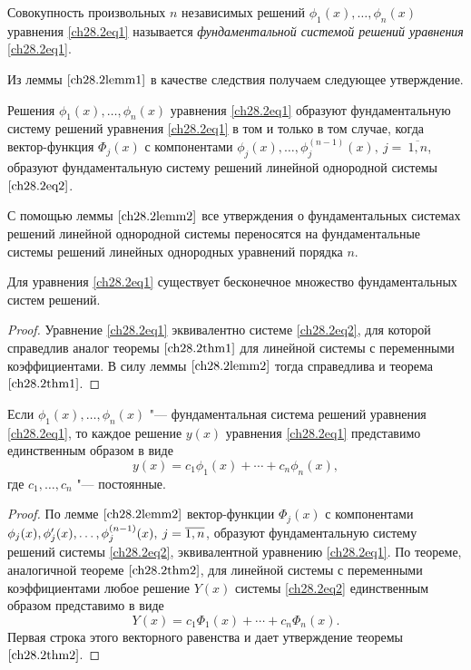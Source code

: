 \begin{defn}
Совокупность произвольных $n$ независимых решений $\phi_1(x), \ldots, \phi_n(x)$ уравнения \eqref{ch28.2eq1} называется \textit{фундаментальной системой решений уравнения} \eqref{ch28.2eq1}.
\end{defn}

Из леммы $\ref{ch28.2lemm1}$ в качестве следствия получаем следующее утверждение.

\begin{lemm} \label{ch28.2lemm2}
Решения $\phi_1(x), \ldots, \phi_n(x)$ уравнения \eqref{ch28.2eq1} образуют фундаментальную систему решений уравнения \eqref{ch28.2eq1} в том и только в том случае, когда вектор-функция $\Phi_j(x)$ с компонентами $\phi_j(x), \ldots, \phi^{(n - 1)}_j(x),\ j =\ \overline{1,n}$, образуют фундаментальную систему решений линейной однородной системы $\eqref{ch28.2eq2}$.
\end{lemm}

С помощью леммы $\ref{ch28.2lemm2}$ все утверждения о фундаментальных системах решений линейной однородной системы переносятся на фундаментальные системы решений линейных однородных уравнений порядка $n$.

\begin{thm} \label{ch28.2thm1}
Для уравнения \eqref{ch28.2eq1} существует бесконечное множество фундаментальных систем решений.
\end{thm}

\begin{proof}
Уравнение \eqref{ch28.2eq1} эквивалентно системе \eqref{ch28.2eq2}, для которой справедлив аналог теоремы $\ref{ch28.2thm1}$ для линейной системы с переменными коэффициентами. В силу леммы $\ref{ch28.2lemm2}$ тогда справедлива и теорема $\ref{ch28.2thm1}$.
\end{proof}

\begin{thm} \label{ch28.2thm2}
Если $\phi_1(x), \ldots, \phi_n(x)$ "--- фундаментальная система решений уравнения \eqref{ch28.2eq1}, то каждое решение $y(x)$ уравнения \eqref{ch28.2eq1} представимо единственным образом в виде
$$
y(x) = c_1\phi_1(x) + \cdots + c_n\phi_n(x),
$$
где $c_1, \ldots, c_n$ "--- постоянные.
\end{thm}

\begin{proof}
По лемме $\ref{ch28.2lemm2}$ вектор-функции $\Phi_j(x)$ с компонентами $\phi_j(x),\\ \phi'_j(x), \ldots, \phi^{(n - 1)}_j(x), \: j = \overline{1,n}$, образуют фундаментальную систему решений системы \eqref{ch28.2eq2}, эквивалентной уравнению \eqref{ch28.2eq1}. По теореме, аналогичной теореме $\ref{ch28.2thm2}$, для линейной системы с переменными коэффициентами любое решение $Y(x)$ системы \eqref{ch28.2eq2} единственным образом представимо в виде
$$
Y(x) = c_1 \Phi_1(x) + \cdots + c_n \Phi_n(x).
$$
Первая строка этого векторного равенства и дает утверждение теоремы~$\ref{ch28.2thm2}$.
\end{proof}

